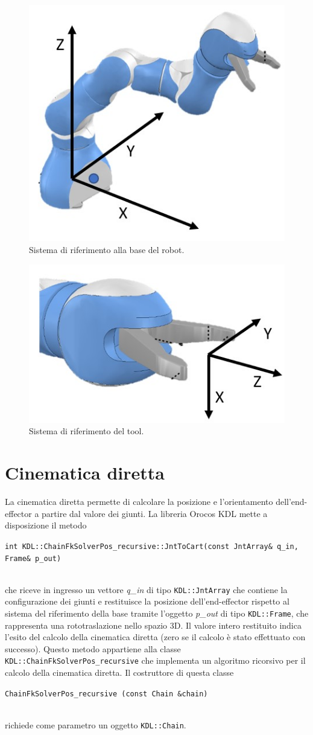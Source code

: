 \begin{figure}[tbh]
	\centering
	\includegraphics[width=0.5\linewidth]{./ImageFiles/prob_frame_base}
	\caption{Sistema di riferimento alla base del robot.}
	\label{fig:base_frame}
\end{figure}

\begin{figure}[tbh]
	\centering
	\includegraphics[width=0.5\linewidth]{./ImageFiles/prob_frame_tool.jpg}
	\caption{Sistema di riferimento del tool.}
	\label{fig:tool_frame}
\end{figure}

\clearpage

\section{Cinematica diretta} \label{cap_fk}
La cinematica diretta permette di calcolare la posizione e l'orientamento dell'end-effector a partire dal valore dei giunti. La libreria Orocos KDL mette a disposizione il metodo \\ \centerline{\texttt{int KDL::ChainFkSolverPos\_recursive::JntToCart(const JntArray\& q\_in, Frame\& p\_out)}} \\ che riceve in ingresso un vettore \textit{q\_in} di tipo \texttt{KDL::JntArray} che contiene la configurazione dei giunti e restituisce la posizione dell'end-effector rispetto al sistema del riferimento della base tramite l'oggetto \textit{p\_out} di tipo \texttt{KDL::Frame}, che rappresenta una rototraslazione nello spazio 3D. Il valore intero restituito indica l'esito del calcolo della cinematica diretta (zero se il calcolo è stato effettuato con successo). Questo metodo appartiene alla classe \texttt{KDL::ChainFkSolverPos\_recursive} che implementa un algoritmo ricorsivo per il calcolo della cinematica diretta. Il costruttore di questa classe \\ \centerline{\texttt{ChainFkSolverPos\_recursive (const Chain \&chain)}} \\ richiede come parametro un oggetto \texttt{KDL::Chain}.

